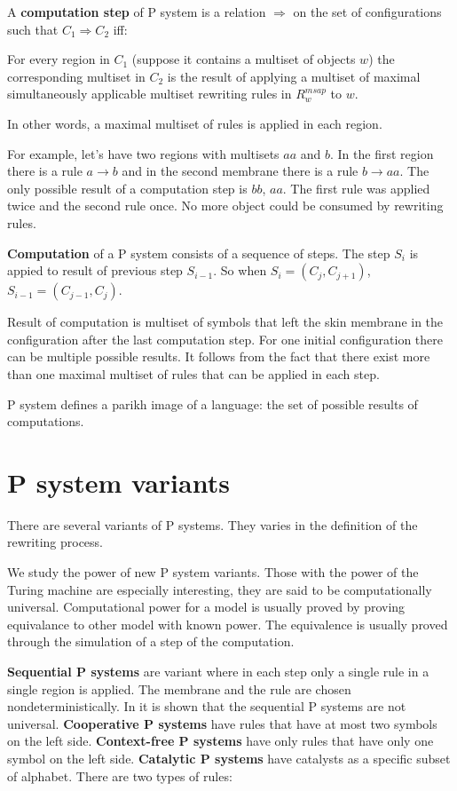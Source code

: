 \documentclass[a4paper,10pt]{article}
\begin{document}

A {\bf computation step} of P system is a relation $\Rightarrow$ on the set of configurations such that $C_1 \Rightarrow C_2$ iff:

For every region in $C_1$ (suppose it contains a multiset of objects $w$) the corresponding multiset in $C_2$ is the result of applying a multiset of maximal simultaneously applicable multiset rewriting rules in $R^{msap}_w$ to $w$.

In other words, a maximal multiset of rules is applied in each region.

For example, let's have two regions with multisets $aa$ and $b$. In the first region there is a rule $a\rightarrow b$ and in the second membrane there is a rule $b\rightarrow aa$. The only possible result of a computation step is $bb$, $aa$. The first rule was applied twice and the second rule once. No more object could be consumed by rewriting rules.


{\bf Computation} of a P system consists of a sequence of steps. The step $S_i$ is appied to result of previous step $S_{i-1}$. So when $S_i = (C_j,C_{j+1})$, $S_{i-1} = (C_{j-1},C_j)$.

Result of computation is multiset of symbols that left the skin membrane in the configuration after the last computation step. For one initial configuration there can be multiple possible results. It follows from the fact that there exist more than one maximal multiset of rules that can be applied in each step.

P system defines a parikh image of a language: the set of possible results of computations.

\section{P system variants}
\label{sec:variants}

There are several variants of P systems. They varies in the definition of the rewriting process.

We study the power of new P system variants. Those with the power of the Turing machine are especially interesting, they are said to be computationally universal. Computational power for a model is usually proved by proving equivalance to other model with known power. The equivalence is usually proved through the simulation of a step of the computation.

{\bf Sequential P systems} are variant where in each step only a single rule in a single region is applied. The membrane and the rule are chosen nondeterministically. In \cite{Ibarra:2005:SPS:2111772.2111880} it is shown that the sequential P systems are not universal.
{\bf Cooperative P systems} have rules that have at most two symbols on the left side.
{\bf Context-free P systems} have only rules that have only one symbol on the left side.
{\bf Catalytic P systems} have catalysts as a specific subset of alphabet. There are two types of rules:
\end{document}
